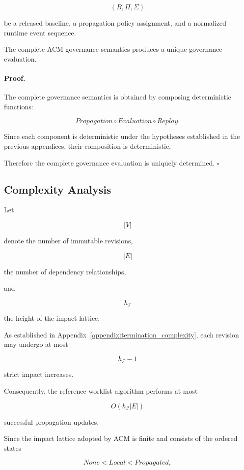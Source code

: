 \documentclass[10pt]{article}
\begin{document}
\[
(B,\Pi,\Sigma)
\]

be a released baseline, a propagation policy assignment, and a normalized
runtime event sequence.

The complete ACM governance semantics produces a unique governance evaluation.

\paragraph*{Proof.}

The complete governance semantics is obtained by composing deterministic
functions:

\[
Propagation
\circ
Evaluation
\circ
Replay.
\]

Since each component is deterministic under the hypotheses established in the
previous appendices, their composition is deterministic.

Therefore the complete governance evaluation is uniquely determined.
\hfill$\square$

\subsection{Complexity Analysis}
\label{appendix:complexity_analysis}

Let

\[
|V|
\]

denote the number of immutable revisions,

\[
|E|
\]

the number of dependency relationships,

and

\[
h_{\mathcal I}
\]

the height of the impact lattice.

As established in Appendix~\ref{appendix:termination_complexity},
each revision may undergo at most

\[
h_{\mathcal I}-1
\]

strict impact increases.

Consequently, the reference worklist algorithm performs at most

\[
O(h_{\mathcal I}|E|)
\]

successful propagation updates.

Since the impact lattice adopted by ACM is finite and consists of the ordered
states

\[
None
<
Local
<
Propagated,
\]
\end{document}
